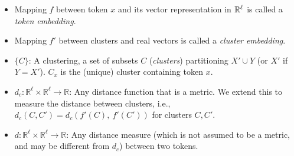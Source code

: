 \begin{itemize}
\setlength\itemsep{0em}

    \item Mapping $f$ between token $x$  and its vector representation in $\mathbb{R}^\ell$ is called a {\em token embedding}. 
    \item Mapping $f'$ between clusters and real vectors is called a {\em cluster embedding}.
    \item $\{C\}$: A clustering, a set of subsets $C$ ({\em clusters}) partitioning $X'\cup Y$ (or $X'$ if $Y = X'$).  $C_x$ is the (unique) cluster  containing token $x$.
    \item $d_c: \mathbb{R}^\ell \times \mathbb{R}^\ell \rightarrow \mathbb{R}$: Any distance function that is a metric. We extend this to measure the distance between clusters, i.e., $d_c(C, C') = d_c\left(f'(C),\ f'(C') \right)$ for clusters $C, C'$.
    \item $d: \mathbb{R}^\ell \times \mathbb{R}^\ell \rightarrow \mathbb{R}$: Any distance measure (which is not assumed to be a metric, and may be different from $d_c$) between two tokens.
\end{itemize}



